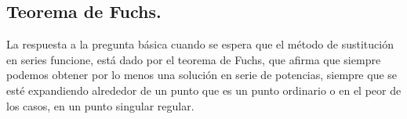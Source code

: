 \subsection{Teorema de Fuchs.}
La respuesta a la pregunta básica cuando se espera que el método de sustitución en series funcione, está dado por el teorema de Fuchs, que afirma que siempre podemos obtener por lo menos una solución en serie de potencias, siempre que se esté expandiendo alrededor de un punto que es un punto ordinario o en el peor de los casos, en un punto singular regular.
